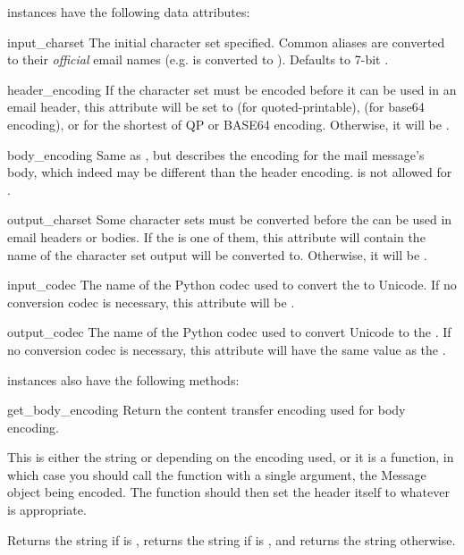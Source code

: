  instances have the following data attributes:

\begin{datadesc}{input_charset}
The initial character set specified.  Common aliases are converted to
their \emph{official} email names (e.g.  is converted to
).  Defaults to 7-bit .
\end{datadesc}

\begin{datadesc}{header_encoding}
If the character set must be encoded before it can be used in an
email header, this attribute will be set to  (for
quoted-printable),  (for base64 encoding), or
 for the shortest of QP or BASE64 encoding.
Otherwise, it will be .
\end{datadesc}

\begin{datadesc}{body_encoding}
Same as , but describes the encoding for the
mail message's body, which indeed may be different than the header
encoding.   is not allowed for
.
\end{datadesc}

\begin{datadesc}{output_charset}
Some character sets must be converted before the can be used in
email headers or bodies.  If the  is one of
them, this attribute will contain the name of the character set
output will be converted to.  Otherwise, it will be .
\end{datadesc}

\begin{datadesc}{input_codec}
The name of the Python codec used to convert the  to
Unicode.  If no conversion codec is necessary, this attribute will be
.
\end{datadesc}

\begin{datadesc}{output_codec}
The name of the Python codec used to convert Unicode to the
.  If no conversion codec is necessary, this
attribute will have the same value as the .
\end{datadesc}

 instances also have the following methods:

\begin{methoddesc}[Charset]{get_body_encoding}{}
Return the content transfer encoding used for body encoding.

This is either the string  or 
depending on the encoding used, or it is a function, in which case you
should call the function with a single argument, the Message object
being encoded.  The function should then set the
 header itself to whatever is
appropriate.

Returns the string  if
 is , returns the string
 if  is , and returns the
string  otherwise.
\end{methoddesc}


